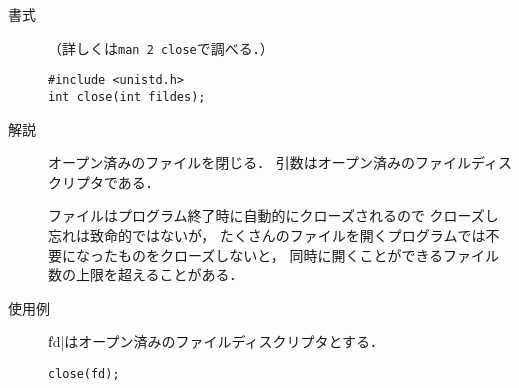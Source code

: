\begin{description}
\item[書式]（詳しくは\texttt{man 2 close}で調べる．）

\begin{lstlisting}[numbers=none]
#include <unistd.h>
int close(int fildes);
\end{lstlisting}

\item[解説]
オープン済みのファイルを閉じる．
引数はオープン済みのファイルディスクリプタである．

ファイルはプログラム終了時に自動的にクローズされるので
クローズし忘れは致命的ではないが，
たくさんのファイルを開くプログラムでは不要になったものをクローズしないと，
同時に開くことができるファイル数の上限を超えることがある．

\item[使用例]
\|fd|はオープン済みのファイルディスクリプタとする．

\begin{lstlisting}[numbers=none]
close(fd);
\end{lstlisting}
\end{description}

%
%
%

